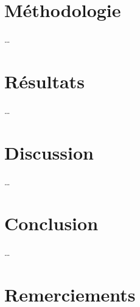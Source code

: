 \documentclass[letterpaper,12pt,oneside]{article}
\begin{document}
\section{Méthodologie}
\dots

\section{Résultats}
\dots

\section{Discussion}
\dots

\section{Conclusion}
\dots

\pagebreak

\section*{Remerciements}

\pagebreak
\setlength{} %
\printbibliography

\pagebreak
\begin{appendices}
 \setcounter{page}{1}
\begin{subappendices}

\end{subappendices}
\end{appendices}
\end{document}
